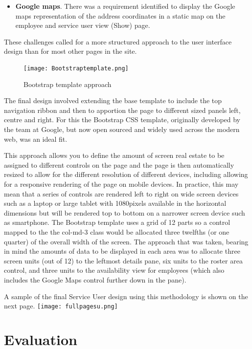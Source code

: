 \documentclass[a4paper,Times New Roman 11pt]{article}
\begin{document}
\begin {itemize}
\item \textbf{Google maps}. There was a requirement identified to display the Google maps representation of the address coordinates in a static map on the employee and service user view (Show) page. 
\end {itemize}

These challenges called for a more structured approach to the user interface design than for most other pages in the site. 
\newline
 \begin{figure}[h!]
\texttt{[image: Bootstraptemplate.png]}
  \caption{Bootstrap template approach}
  \label{fig:Bootstraptemplate}
\end{figure}

The final design involved extending the base template to include the top navigation ribbon and then to apportion the page to different sized panels left, centre and right. For this the Bootstrap CSS template,  originally developed by the team at Google, but now open sourced and widely used across the modern web, was an ideal fit.

This approach allows you to define the amount of screen real estate to be assigned to different controls on the page and the page is then automatically resized to allow for the different resolution of different devices, including allowing for a responsive rendering of the page on mobile devices. In practice, this may mean that a series of controls are rendered left to right on wide screen devices such as a laptop or large tablet with 1080pixels available in the horizontal dimensions but will be rendered top to bottom on a narrower screen device such as smartphone. The Bootstrap template uses a grid of 12 parts so a control mapped to the the col-md-3 class  would be allocated three twelfths (or one quarter) of the overall width of the screen. The approach that was taken, bearing in mind the amounts of data to be displayed in each area was to allocate three screen units (out of 12) to the leftmost details pane, six units to the roster area control, and three units to the availability view for employees (which also includes the Google Maps control further down in the pane).

A sample of the final Service User design using this methodology is shown on the next page.
 \center
\texttt{[image: fullpagesu.png]}


\section {Evaluation}
\end{document}
